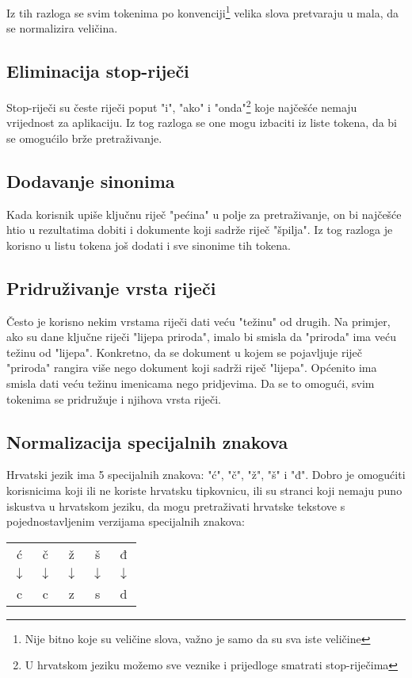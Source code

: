 \documentclass[11pt]{scrreprt}
\begin{document}
Iz tih razloga se svim tokenima po konvenciji\footnote{Nije bitno koje su veličine slova, važno je samo da su sva iste veličine} velika slova pretvaraju u mala, da se normalizira veličina.

\subsection{Eliminacija stop-riječi}

Stop-riječi su česte riječi poput "i", "ako" i "onda"\footnote{U hrvatskom jeziku možemo sve veznike i prijedloge smatrati stop-riječima} koje najčešće nemaju vrijednost za aplikaciju. Iz tog razloga se one mogu izbaciti iz liste tokena, da bi se omogućilo brže pretraživanje.

\subsection{Dodavanje sinonima}

Kada korisnik upiše ključnu riječ "pećina" u polje za pretraživanje, on bi najčešće htio u rezultatima dobiti i dokumente koji sadrže riječ "špilja". Iz tog razloga je korisno u listu tokena još dodati i sve sinonime tih tokena.

\subsection{Pridruživanje vrsta riječi}

Često je korisno nekim vrstama riječi dati veću "težinu" od drugih. Na primjer, ako su dane ključne riječi "lijepa priroda", imalo bi smisla da "priroda" ima veću težinu od "lijepa". Konkretno, da se dokument u kojem se pojavljuje riječ "priroda" rangira više nego dokument koji sadrži riječ "lijepa". Općenito ima smisla dati veću težinu imenicama nego pridjevima. Da se to omogući, svim tokenima se pridružuje i njihova vrsta riječi.

\subsection{Normalizacija specijalnih znakova}

Hrvatski jezik ima 5 specijalnih znakova: "ć", "č", "ž", "š" i "đ". Dobro je omogućiti korisnicima koji ili ne koriste hrvatsku tipkovnicu, ili su stranci koji nemaju puno iskustva u hrvatskom jeziku, da mogu pretraživati hrvatske tekstove s pojednostavljenim verzijama specijalnih znakova:

\begin{center}
  \begin{tabular}{ccccc}
    ć            & č            & ž            & š            & đ            \\
    $\downarrow$ & $\downarrow$ & $\downarrow$ & $\downarrow$ & $\downarrow$ \\
    c            & c            & z            & s            & d            \\
  \end{tabular}
\end{center}
\end{document}
